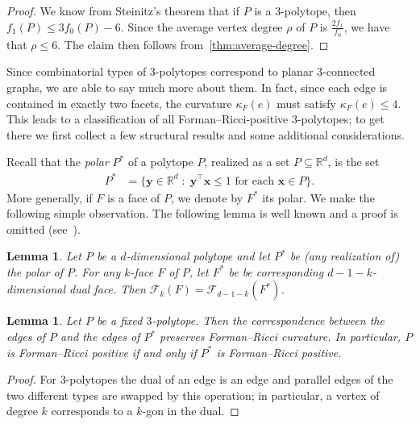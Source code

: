 \documentclass[11pt,a4paper]{amsart}
\newcommand{\forman}[1]{\kappa_F\left({#1}\right)}
\newtheorem{lemma}[theorem]{Lemma}
\begin{document}
\begin{proof}
    We know from Steinitz's theorem that if $P$ is a $3$-polytope, then $f_1(P) \le 3f_0(P)-6$. Since the average vertex degree $\rho$ of $P$ is $\frac{2f_1}{f_0}$, we have that $\rho\leq 6$. The claim then follows from~\cref{thm:average-degree}. 
\end{proof}

Since combinatorial types of $3$-polytopes correspond to planar $3$-connected graphs, we are able to say much more about them. In fact, since each edge is contained in exactly two facets, the curvature $\forman{e}$ must satisfy $\forman{e}\leq 4$. This leads to a classification of all Forman--Ricci-positive $3$-polytopes; to get there we first collect a few structural results and some additional considerations.

Recall that the \emph{polar} $P^\ast$ of a polytope $P$, realized as a set $P\subseteq\mathbb{R}^{d}$, is the set
    \begin{align}
        P^\ast &= \{\mathbf{y}\in\mathbb{R}^d \;:\; \mathbf{y}^\top \mathbf x\leq 1\text{ for each }\mathbf{x}\in P\}.
    \end{align}
More generally, if $F$ is a face of $P$, we denote by $F^\ast$ its polar. We make the following simple observation.  The following lemma is well known and a proof is omitted (see~\cite[Sec. 3.4]{Grunbaum}).

\begin{lemma}\label{lem:duality}
    Let $P$ be a $d$-dimensional polytope and let $P^*$ be (any realization of) the polar of $P$. For any $k$-face $F$ of $P$, let $F^*$ be be corresponding $d-1-k$-dimensional dual face. Then $\mathcal{F}_k(F)= \mathcal{F}_{d-1-k}(F^*)$.
\end{lemma}

\begin{lemma}\label{lem:simplicial-positive-dual}
    Let $P$ be a fixed $3$-polytope. Then the correspondence between the edges of $P$ and the edges of $P^*$ preserves Forman--Ricci curvature. In particular, $P$ is Forman--Ricci positive if and only if $P^*$ is Forman--Ricci positive. 
\end{lemma}

\begin{proof}
    For $3$-polytopes the dual of an edge is an edge and parallel edges of the two different types are swapped by this operation; in particular, a vertex of degree $k$ corresponds to a $k$-gon in the dual.
\end{proof}
\end{document}
